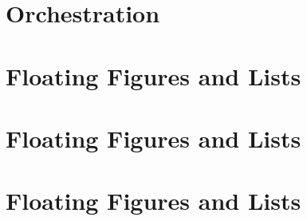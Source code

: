 \documentclass[letterpaper,twocolumn,10pt]{article}
\begin{document}
\section{Orchestration}


\section{Floating Figures and Lists}


\section{Floating Figures and Lists}



\section{Floating Figures and Lists}





\end{document}
